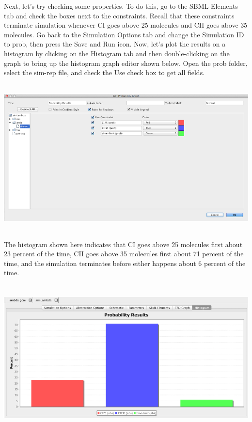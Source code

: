 \documentclass[titlepage,11pt]{article}
\begin{document}
Next, let's try checking some properties.  To do this, go to the SBML Elements tab and check the boxes next to the constraints.  Recall that these constraints terminate simulation whenever CI goes above 25 molecules and CII goes above 35 molecules.  Go back to the Simulation Options tab and change the Simulation ID to prob, then press the Save and Run icon.  Now, let's plot the results on a histogram by clicking on the Histogram tab and then double-clicking on the graph to bring up the histogram graph editor shown below.  Open the prob folder, select the sim-rep file, and check the Use check box to get all fields.  

\begin{center}
\includegraphics[height=80mm]{screenshots/editProbGraph}
\end{center}

The histogram shown here indicates that CI goes above 25 molecules first about 23 percent of the time, CII goes above 35 molecules first about 71 percent of the time, and the simulation terminates before either happens about 6 percent of the time.

\begin{center} 
\includegraphics[height=80mm]{screenshots/probResults}
\end{center}
\end{document}
